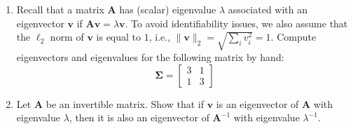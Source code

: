 \documentclass[11pt,twoside]{article}
\begin{document}
\begin{enumerate}[label=(\alph*)]
\item Recall that a matrix $\mathbf A$ has (scalar) eigenvalue $\lambda$ associated with an eigenvector $\mathbf v$ if $\mathbf{A} \mathbf{v} = \lambda \mathbf{v}$. To avoid identifiability issues, we also assume that the $\ell_2$ norm of $\mathbf{v}$ is equal to $1$, i.e., $\| \mathbf{v} \|_2 = \sqrt{\sum_i v_i^2} = 1$. Compute eigenvectors and eigenvalues for the following matrix by hand:
$$\mathbf{\Sigma} = \begin{bmatrix}3 & 1\\1 & 3\end{bmatrix}$$
        \item Let $\mathbf A$ be an invertible matrix. Show that if $\mathbf v$ is an eigenvector of $\mathbf A$ with eigenvalue $\lambda$, then it is also an eigenvector of $\mathbf{A}^{-1}$ with eigenvalue $\lambda^{-1}$.

\end{enumerate}
\end{document}
